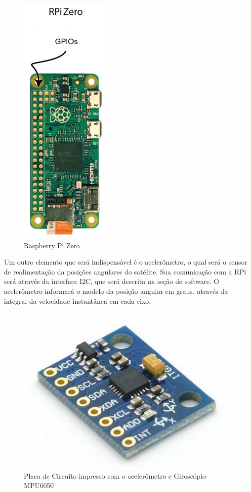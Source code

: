 \begin{figure}[H]
  \caption{Raspberry Pi Zero}
  \begin{center}
      \includegraphics[scale=.55]{metodologia/img/rasp_zero}
  \end{center}
  \label{fig:rasp_zero}
\end{figure}

Um outro elemento que será indispensável é o acelerômetro, o qual será o sensor de realimentação da posições angulares do satélite. Sua comunicação com a RPi será através da interface I2C, que será descrita na seção de software. O acelerômetro informará o modelo da posição angular em graus, através da integral da velocidade instantânea em cada eixo.

\begin{figure}[H]
  \caption{Placa de Circuito impresso com o acelerômetro e Giroscópio MPU6050}
  \begin{center}
      \includegraphics[scale=.4]{metodologia/img/pci_acelerometro_calache_p22}
  \end{center}
  \label{fig:pci_acelerometro_calache_p22}
\end{figure}

